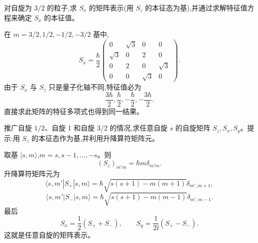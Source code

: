 \begin{question}
对自旋为 $3/2$ 的粒子,求 $S_x$ 的矩阵表示(用 $S_z$ 的本征态为基),并通过求解特征值方程来确定 $S_x$ 的本征值。
\begin{solution}

在 $m=3/2,1/2,-1/2,-3/2$ 基中,
\[
S_x=\frac{\hbar}{2}\begin{pmatrix}
0&\sqrt3&0&0\\
\sqrt3&0&2&0\\
0&2&0&\sqrt3\\
0&0&\sqrt3&0
\end{pmatrix}.
\]
由于 $S_x$ 与 $S_z$ 只是量子化轴不同,特征值必为
\[
\frac{3\hbar}{2},\frac{\hbar}{2},-\frac{\hbar}{2},-\frac{3\hbar}{2}.
\]
直接求此矩阵的特征多项式也得到同一结果。

\end{solution}
\end{question}

\begin{question}
推广自旋 $1/2$、自旋 1 和自旋 $3/2$ 的情况,求任意自旋 $s$ 的自旋矩阵 $S_z,S_x,S_y$。提示:用 $S_z$ 的本征态作为基,并利用升降算符矩阵元。
\begin{solution}

取基 $|s,m\rangle$,$m=s,s-1,\ldots,-s$。则
\[
(S_z)_{m'm}=\hbar m\delta_{m'm}.
\]
升降算符矩阵元为
\[
\langle s,m'|S_+|s,m\rangle=
\hbar\sqrt{s(s+1)-m(m+1)}\delta_{m',m+1},
\]
\[
\langle s,m'|S_-|s,m\rangle=
\hbar\sqrt{s(s+1)-m(m-1)}\delta_{m',m-1}.
\]
最后
\[
S_x=\frac12(S_++S_-),
\qquad
S_y=\frac{1}{2\ii}(S_+-S_-).
\]
这就是任意自旋的矩阵表示。

\end{solution}
\end{question}

